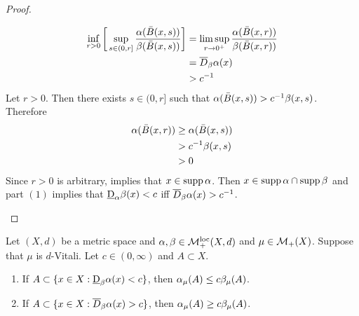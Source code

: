 \documentclass{book}
\begin{document}
\begin{proof}
\begin{enumerate}
\begin{itemize}
				\begin{align*}
					\inf_{r > 0} \bigg[ \sup_{s \in (0,r]} \frac{\alpha(\bar{B}(x, s))}{\beta(\bar{B}(x, s))} \bigg] 
					& = \limsup_{r \rightarrow 0^+} \frac{\alpha(\bar{B}(x, r))}{\beta(\bar{B}(x, r))} \\
					& = \overline{D}_{\beta}\alpha (x) \\
					& > c^{-1} 
				\end{align*}
				Let $r > 0$.  Then  there exists $s \in (0,r]$ such that $\alpha(\bar{B}(x, s)) > c^{-1} \beta(x, s)$. Therefore 
				\begin{align*}
					\alpha(\bar{B}(x, r))
					& \geq \alpha(\bar{B}(x, s)) \\
					& > c^{-1} \beta(x, s) \\
					& > 0
				\end{align*}
				Since $r > 0$ is arbitrary,  implies that $x \in \operatorname{supp} \alpha$. Then $x \in \operatorname{supp} \alpha \cap \operatorname{supp} \beta$ and part $(1)$ implies that $\underbar{D}_{\alpha} \beta (x) < c$ iff $\overline{D}_{\beta}\alpha(x) > c^{-1}$.
			\end{itemize}
		\end{enumerate}
	\end{proof}
	
	\begin{ex} 
		Let $(X, d)$ be a metric space and $\alpha, \beta \in \mathcal{M}_+^{\text{loc}}(X, d)$ and $\mu \in \mathcal{M}_+(X)$. Suppose that $\mu$ is $d$-Vitali. Let $c \in (0,\infty)$ and $A \subset X$. 
		\begin{enumerate}
			\item If $A \subset \{x \in X: \underbar{D}_{\beta}\alpha(x) < c\}$, then $\alpha_{\mu}(A) \leq c \beta_{\mu}(A)$. 
			\item If $A \subset \{x \in X: \overline{D}_{\beta}\alpha(x) > c\}$, then $\alpha_{\mu}(A) \geq c \beta_{\mu}(A)$. 
		\end{enumerate}
	\end{ex}
	
\end{document}
